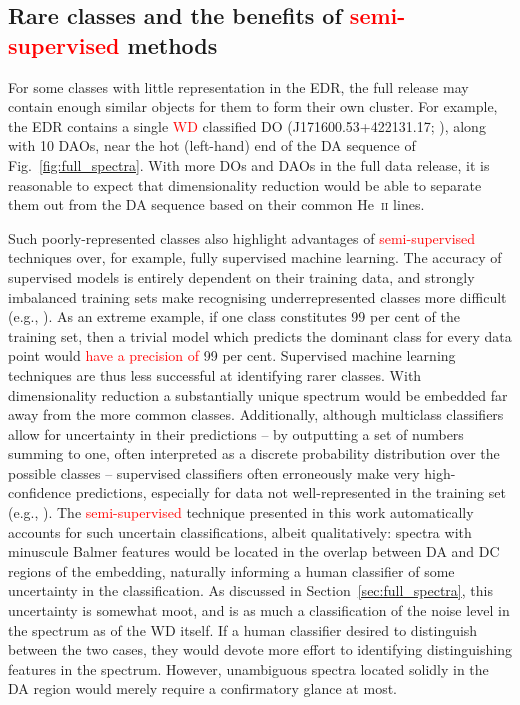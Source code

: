 \documentclass[fleqn,usenatbib]{mnras}
\newcommand{\red}[1]{\textcolor{red}{#1}}
\begin{document}
\subsection{Rare classes and the benefits of \red{semi-supervised} methods}
\label{sec:rare}

For some classes with little representation in the EDR, the full release may contain enough similar objects for them to form their own cluster.
For example, the EDR contains a single \red{WD} classified DO (J171600.53+422131.17; \citealt{manser24}), along with 10 DAOs, near the hot (left-hand) end of the DA sequence of Fig.~\ref{fig:full_spectra}.
With more DOs and DAOs in the full data release, it is reasonable to expect that dimensionality reduction would be able to separate them out from the DA sequence based on their common He~\textsc{ii} lines.

Such poorly-represented classes also highlight advantages of \red{semi-supervised} techniques over, for example, fully supervised machine learning.
The accuracy of supervised models is entirely dependent on their training data, and strongly imbalanced training sets make recognising underrepresented classes more difficult (e.g., \citealt{he09, johnson19, das23}).
As an extreme example, if one class constitutes 99 per cent of the training set, then a trivial model which predicts the dominant class for every data point would \red{have a precision of} 99 per cent.
Supervised machine learning techniques are thus less successful at identifying rarer classes.
With dimensionality reduction a substantially unique spectrum would be embedded far away from the more common classes.
Additionally, although multiclass classifiers allow for uncertainty in their predictions -- by outputting a set of numbers summing to one, often interpreted as a discrete probability distribution over the possible classes -- supervised classifiers often erroneously make very high-confidence predictions, especially for data not well-represented in the training set (e.g., \citealt{nguyen15, guo17, hein19}).
The \red{semi-supervised} technique presented in this work automatically accounts for such uncertain classifications, albeit qualitatively: spectra with minuscule Balmer features would be located in the overlap between DA and DC regions of the embedding, naturally informing a human classifier of some uncertainty in the classification.
As discussed in Section~\ref{sec:full_spectra}, this uncertainty is somewhat moot, and is as much a classification of the noise level in the spectrum as of the WD itself.
If a human classifier desired to distinguish between the two cases, they would devote more effort to identifying distinguishing features in the spectrum.
However, unambiguous spectra located solidly in the DA region would merely require a confirmatory glance at most.
\end{document}

